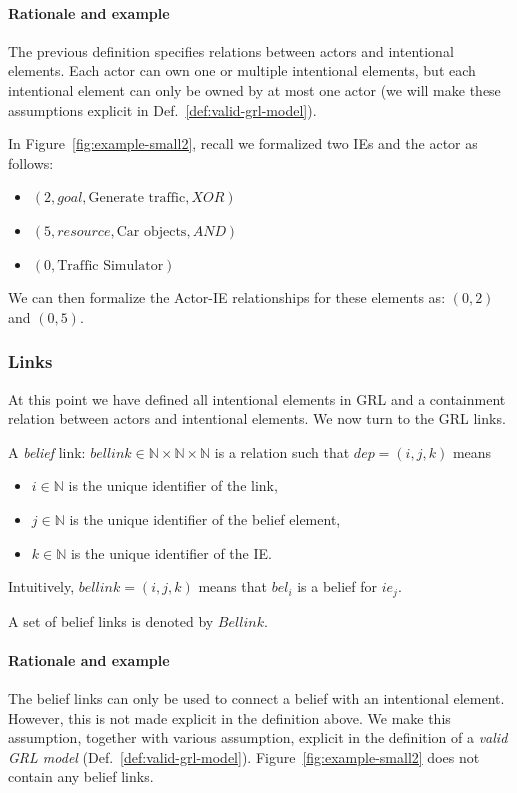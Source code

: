 \paragraph{Rationale and example} The previous definition specifies relations between actors and intentional elements. Each actor can own one or multiple intentional elements, but each intentional element can only be owned by at most one actor (we will make these assumptions explicit in Def.~\ref{def:valid-grl-model}).

In Figure~\ref{fig:example-small2}, recall we formalized two IEs and the actor as follows:
\begin{itemize}
\item $(2, goal, \text{Generate traffic}, XOR)$
\item $(5, resource, \text{Car objects}, AND)$
\item $(0, \text{Traffic Simulator})$
\end{itemize}

We can then formalize the Actor-IE relationships for these elements as: $(0,2)$ and $(0,5)$.

\subsubsection{Links}

At this point we have defined all intentional elements in GRL and a containment relation between actors and intentional elements. We now turn to the GRL links.

\begin{definition}
\label{def:link:belief}
A \emph{belief} link: $bellink\in \mathbb{N}\times\mathbb{N}\times\mathbb{N}$ is a relation such that $dep = (i,j,k)$ means
\begin{itemize}
\item $i\in \mathbb{N}$ is the unique identifier of the link,
\item $j\in \mathbb{N}$ is the unique identifier of the belief element,
\item $k\in \mathbb{N}$ is the unique identifier of the IE.
\end{itemize}
Intuitively, $bellink = (i,j,k)$ means that $bel_i$ is a belief for $ie_j$.

A set of belief links is denoted by $Bellink$.
\end{definition}

\paragraph{Rationale and example} The belief links can only be used to connect a belief with an intentional element. However, this is not made explicit in the definition above. We make this assumption, together with various assumption, explicit in the definition of a \emph{valid GRL model} (Def.~\ref{def:valid-grl-model}). Figure~\ref{fig:example-small2} does not contain any belief links.

